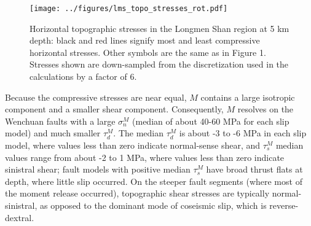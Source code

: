 \documentclass[twocolumn,jgrga]{AGUTeX}
\begin{document}
\begin{article}
\begin{figure}[t]
\centering
\texttt{[image: ../figures/lms\_topo\_stresses\_rot.pdf]}
\caption{Horizontal topographic stresses in the Longmen Shan region at 5
km depth: black and red lines signify most and least compressive
horizontal stresses. Other symbols are the same as in Figure
1. Stresses shown are down-sampled from the
discretization used in the calculations by a factor of 6.}
\label{fig:lms_topo_stresses_rot}
\end{figure}

Because the compressive stresses are near equal, $M$ contains a large
isotropic component and a smaller shear component. Consequently, $M$
resolves on the Wenchuan faults with a large $\sigma^M_n$ (median of
about 40-60 MPa for each slip model) and much smaller $\tau^M_d$. The
median $\tau^M_d$ is about -3 to -6 MPa in each slip model, where values
less than zero indicate normal-sense shear, and $\tau^M_s$ median values
range from about -2 to 1 MPa, where values less than zero indicate
sinistral shear; fault models with positive median $\tau^M_s$ have broad
thrust flats at depth, where little slip occurred. On the steeper fault
segments (where most of the moment release occurred), topographic shear
stresses are typically normal-sinistral, as opposed to the dominant mode
of coseismic slip, which is reverse-dextral.


\end{article}
\end{document}
